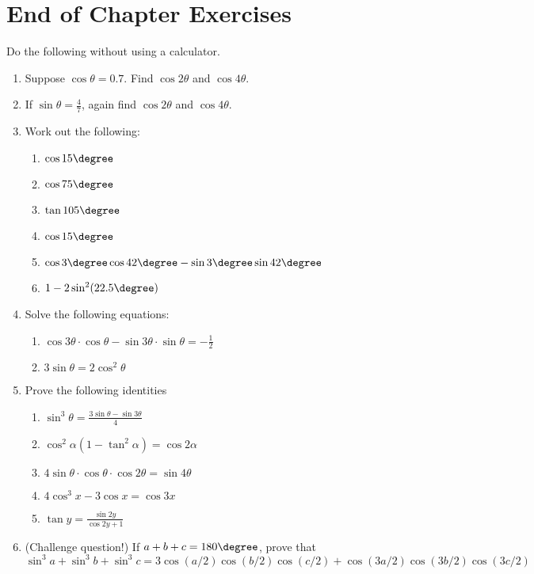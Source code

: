 \section{End of Chapter Exercises}
Do the following without using a calculator.
\begin{enumerate}
\item Suppose $\cos\theta=0.7$. Find $\cos 2\theta$ and $\cos 4\theta$.
\item If $\sin\theta=\frac{4}{7}$, again find $\cos 2\theta$ and $\cos 4\theta$.
\item Work out the following:
\begin{enumerate}
\item $\cos 15\degree$
\item $\cos 75\degree$
\item $\tan 105\degree$
\item $\cos 15\degree$
\item $\cos 3\degree \cos 42\degree -\sin 3\degree \sin 42\degree$
\item $1-2 \sin^2 (22.5\degree)$
\end{enumerate}
\item Solve the following equations:
\begin{enumerate}
\item $\cos 3\theta\cdot\cos\theta-\sin 3\theta\cdot\sin\theta=-\frac{1}{2}$
\item $3\sin \theta=2\cos^2\theta$

\end{enumerate}
\item Prove the following identities
\begin{enumerate}
\item $\sin^3\theta=\frac{3\sin\theta-\sin 3\theta}{4}$
\item $\cos^2\alpha (1-\tan^2\alpha)=\cos 2\alpha$
\item $4\sin\theta\cdot\cos\theta\cdot\cos 2\theta= \sin 4\theta$
\item $4\cos^3 x -3\cos x=\cos 3x$
\item $\tan y=\frac{\sin 2y}{\cos 2y+1}$
\end{enumerate}
\item (Challenge question!) If $a+b+c=180\degree$, prove that 
$$\sin^3 a+\sin^3 b+ \sin^3 c = 3\cos(a/2)\cos(b/2)\cos(c/2)+ \cos(3a/2)\cos(3b/2)\cos(3c/2)$$

\end{enumerate}










